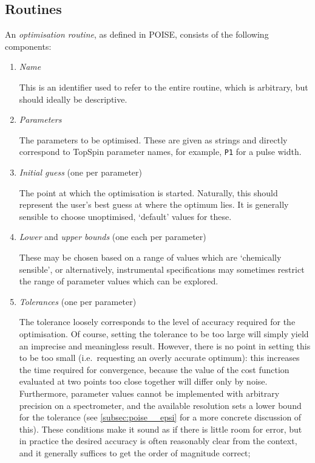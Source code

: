 \subsection{Routines}
\label{subsec:poise__routines}

An \textit{optimisation routine}, as defined in POISE, consists of the following components:

\begin{enumerate}
    \item \textit{Name}

        This is an identifier used to refer to the entire routine, which is arbitrary, but should ideally be descriptive.

    \item \textit{Parameters}

        The parameters to be optimised.
        These are given as strings and directly correspond to TopSpin parameter names, for example, \texttt{P1} for a pulse width.

    \item \textit{Initial guess} (one per parameter)

        The point at which the optimisation is started.
        Naturally, this should represent the user's best guess at where the optimum lies.
        It is generally sensible to choose unoptimised, `default' values for these.
        
    \item \textit{Lower} and \textit{upper bounds} (one each per parameter)

        These may be chosen based on a range of values which are `chemically sensible', or alternatively, instrumental specifications may sometimes restrict the range of parameter values which can be explored.

    \item \textit{Tolerances} (one per parameter)

        The tolerance loosely corresponds to the level of accuracy required for the optimisation.
        Of course, setting the tolerance to be too large will simply yield an imprecise and meaningless result.
        However, there is no point in setting this to be too small (i.e.\ requesting an overly accurate optimum): this increases the time required for convergence, because the value of the cost function evaluated at two points too close together will differ only by noise.
        Furthermore, parameter values cannot be implemented with arbitrary precision on a spectrometer, and the available resolution sets a lower bound for the tolerance (see \cref{subsec:poise__epsi} for a more concrete discussion of this).
        These conditions make it sound as if there is little room for error, but in practice the desired accuracy is often reasonably clear from the context, and it generally suffices to get the order of magnitude correct;


\end{enumerate}
